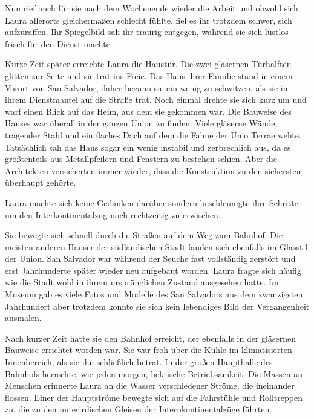 \par

Nun rief auch für sie nach dem Wochenende wieder die Arbeit und obwohl sich Laura allerorts gleichermaßen schlecht fühlte, fiel es ihr trotzdem schwer, sich aufzuraffen. Ihr Spiegelbild sah ihr traurig entgegen, während sie sich lustlos frisch für den Dienst machte.

\par

Kurze Zeit später erreichte Laura die Haustür. Die zwei gläsernen Türhälften glitten zur Seite und sie trat ins Freie. Das Haus ihrer Familie stand in einem Vorort von San Salvador, daher begann sie ein wenig zu schwitzen, als sie in ihrem Dienstmantel auf die Straße trat. Noch einmal drehte sie sich kurz um und warf einen Blick auf das Heim, aus dem sie gekommen war. Die Bauweise des Hauses war überall in der ganzen Union zu finden. Viele gläserne Wände, tragender Stahl und ein flaches Dach auf dem die Fahne der Unio Terrae wehte. Tatsächlich sah das Haus sogar ein wenig instabil und zerbrechlich aus, da es größtenteils aus Metallpfeilern und Fenstern zu bestehen schien. Aber die Architekten versicherten immer wieder, dass die Konstruktion zu den sichersten überhaupt gehörte.

\par

Laura machte sich keine Gedanken darüber sondern beschleunigte ihre Schritte um den Interkontinentalzug noch rechtzeitig zu erwischen.

\par

Sie bewegte sich schnell durch die Straßen auf dem Weg zum Bahnhof. Die meisten anderen Häuser der südländischen Stadt fanden sich ebenfalls im Glasstil der Union. San Salvador war während der Seuche fast vollständig zerstört und erst Jahrhunderte später wieder neu aufgebaut worden. Laura fragte sich häufig wie die Stadt wohl in ihrem ursprünglichen Zustand ausgesehen hatte. Im Museum gab es viele Fotos und Modelle des San Salvadors aus dem zwanzigsten Jahrhundert aber trotzdem konnte sie sich kein lebendiges Bild der Vergangenheit ausmalen.

\par

Nach kurzer Zeit hatte sie den Bahnhof erreicht, der ebenfalls in der gläsernen Bauweise errichtet worden war. Sie war froh über die Kühle im klimatisierten Innenbereich, als sie ihn schließlich betrat. In der großen Haupthalle des Bahnhofs herrschte, wie jeden morgen, hektische Betriebsamkeit. Die Massen an Menschen erinnerte Laura an die Wasser verschiedener Ströme, die ineinander flossen. Einer der Hauptströme bewegte sich auf die Fahrstühle und Rolltreppen zu, die zu den unterirdischen Gleisen der Internkontinentalzüge führten.

